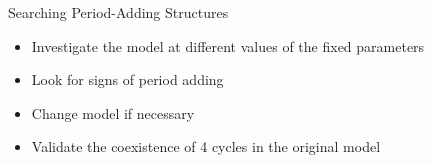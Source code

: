 %
%
%

\begin{frame}{Searching Period-Adding Structures}
    \begin{itemize}
        \item Investigate the model at different values of the fixed parameters
        \item Look for signs of period adding
        \item Change model if necessary \pause \vspace{1em}
        \item Validate the coexistence of 4 cycles in the original model
    \end{itemize}
\end{frame}